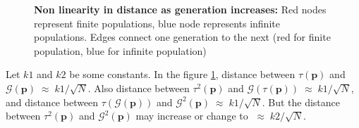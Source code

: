 \begin{figure}[htp]
\begin{center}
\hspace{5pt}
\caption[\textbf{Non linearity in distance as generation increases}]{\textbf{Non linearity in distance as generation increases:} 
Red nodes represent finite populations, blue node represents infinite populations. 
Edges connect one generation to the next (red for finite population, blue for infinite population)}
\label{nonlinear}
\end{center}
\end{figure}
Let $k1$ and $k2$ be some constants. In the figure \ref{nonlinear}, distance between $\tau(\bm{p})$ and $\mathcal{G}(\bm{p}) \;\approx \; k1/\sqrt{N}$. 
Also distance between $\tau^2(\bm{p})$ and $\mathcal{G}(\tau(\bm{p}))  \;\approx \; k1/\sqrt{N}$, 
and distance between $\tau(\mathcal{G}(\bm{p}))$ and $\mathcal{G}^2(\bm{p}) \;\approx \; k1/\sqrt{N}$. 
But the distance between $\tau^2(\bm{p})$ and $\mathcal{G}^2(\bm{p}) $ may increase or change to $\;\approx \; k2/\sqrt{N}$.

